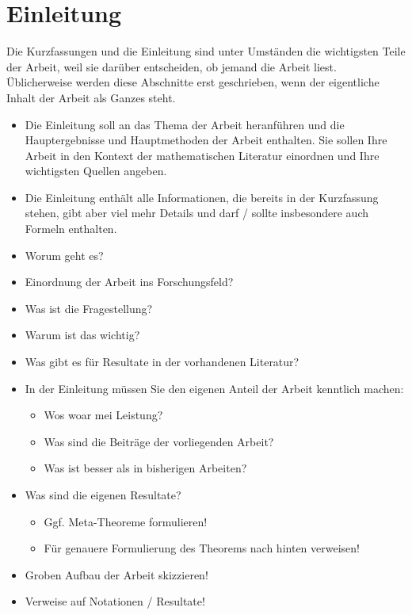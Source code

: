 \documentclass[../main.tex]{subfiles}
\begin{document}
\chapter{Einleitung}
\label{chapter:introduction}

\noindent
Die Kurzfassungen und die Einleitung sind unter Umständen die wichtigsten Teile der Arbeit, weil sie darüber entscheiden, ob jemand die Arbeit liest. Üblicherweise werden diese Abschnitte erst geschrieben, wenn der eigentliche Inhalt der Arbeit als Ganzes steht.

\begin{itemize}

    \item Die Einleitung soll an das Thema der Arbeit heranführen und die Hauptergebnisse und Hauptmethoden der Arbeit enthalten. Sie sollen Ihre Arbeit in den Kontext der mathematischen Literatur einordnen und Ihre wichtigsten Quellen angeben.

    \item Die Einleitung enthält alle Informationen, die bereits in der Kurzfassung stehen, gibt aber viel mehr Details und darf / sollte insbesondere auch Formeln enthalten.

    \item Worum geht es?
    \item Einordnung der Arbeit ins Forschungsfeld?
    \item Was ist die Fragestellung?
    \item Warum ist das wichtig?
    \item Was gibt es für Resultate in der vorhandenen Literatur?

    \item In der Einleitung müssen Sie den eigenen Anteil der Arbeit kenntlich machen:
          \begin{itemize}
              \item Wos woar mei Leistung?
              \item Was sind die Beiträge der vorliegenden Arbeit?
              \item Was ist besser als in bisherigen Arbeiten?
          \end{itemize}

    \item Was sind die eigenen Resultate?
          \begin{itemize}
              \item Ggf. Meta-Theoreme formulieren!
              \item Für genauere Formulierung des Theorems nach hinten verweisen!
          \end{itemize}

    \item Groben Aufbau der Arbeit skizzieren!
    \item Verweise auf Notationen / Resultate!
\end{itemize}
\end{document}
